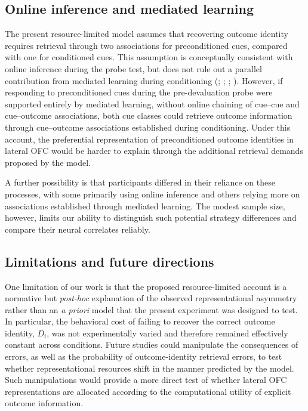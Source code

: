 \documentclass[12pt,letterpaper]{article}
\DeclareRobustCommand{\hl}{\textcolor{reviewtext}}
\begin{document}
\subsection*{\hl{Online inference and mediated learning}}

\hl{The present resource-limited model assumes that recovering outcome identity requires retrieval through two associations for preconditioned cues, compared with one for conditioned cues. This assumption is conceptually consistent with online inference during the probe test, but does not rule out a parallel contribution from mediated learning during conditioning (\mbox{\citealp{RN512}}; \mbox{\citealp{RN507}}; \mbox{\citealp{RN509}}; \mbox{\citealp{wang2020targeted}}). However, if responding to preconditioned cues during the pre-devaluation probe were supported entirely by mediated learning, without online chaining of cue--cue and cue--outcome associations, both cue classes could retrieve outcome information through cue--outcome associations established during conditioning. Under this account, the preferential representation of preconditioned outcome identities in lateral OFC would be harder to explain through the additional retrieval demands proposed by the model.}

\hl{A further possibility is that participants differed in their reliance on these processes, with some primarily using online inference and others relying more on associations established through mediated learning. The modest sample size, however, limits our ability to distinguish such potential strategy differences and compare their neural correlates reliably.}


\subsection*{Limitations and future directions}

One limitation of our work is that the proposed resource-limited account is a normative but \textit{post-hoc} explanation of the observed representational asymmetry rather than an \textit{a priori} model that the present experiment was designed to test. In particular, the behavioral cost of failing to recover the correct outcome identity, \(D_i\), was not experimentally varied and therefore remained effectively constant across conditions. Future studies could manipulate the consequences of errors, as well as the probability of outcome-identity retrieval errors, to test whether representational resources shift in the manner predicted by the model. Such manipulations would provide a more direct test of whether lateral OFC representations are allocated according to the computational utility of explicit outcome information.
\end{document}
